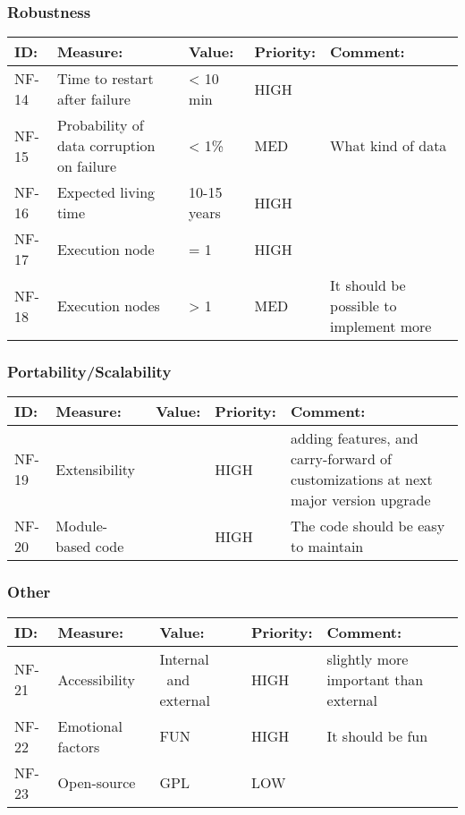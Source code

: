 \subsubsection{Robustness}
\begin{supertabular}{|l|p{5cm}|p{1.8cm}|l|p{4.4cm}|}
\hline
\textbf{ID:} & \textbf{Measure:} & \textbf{Value:} & \textbf{Priority:} & \textbf{Comment:}\\
\hline

NF-14 & Time to restart after failure &
{\textless} 10 min &
HIGH &
\\\hline

NF-15 &
Probability of data corruption on failure &
{\textless} 1\% &
MED & What kind of data\\
\hline

NF-16 & Expected living time & 10-15 years & HIGH & \\
\hline

NF-17 & Execution node & = 1  & HIGH &\\
\hline

NF-18 & Execution nodes & {\textgreater} 1 & MED & It should be possible to
implement more\\
\hline
\end{supertabular}

\subsubsection{Portability/Scalability}

\begin{supertabular}{|l|p{5cm}|p{1.8cm}|l|p{4.4cm}|}
\hline
\textbf{ID:} & \textbf{Measure:} & \textbf{Value:} & \textbf{Priority:} & \textbf{Comment:}\\
\hline

NF-19 & Extensibility && HIGH & adding features, and carry-forward of
customizations at next major version upgrade\\
\hline

NF-20 & Module-based code && HIGH & The code should be easy to maintain\\
\hline
\end{supertabular}

\subsubsection{Other}
\begin{supertabular}{|l|p{5cm}|p{1.8cm}|l|p{4.4cm}|}
\hline
\textbf{ID:} & \textbf{Measure:} & \textbf{Value:} & \textbf{Priority:} & \textbf{Comment:}\\
\hline

NF-21 & Accessibility & Internal \ and external & HIGH & slightly more
important than external \\
\hline

NF-22 & Emotional factors & FUN & HIGH & It should be fun\\
\hline

NF-23 & Open-source & GPL & LOW & \\
\hline
\end{supertabular}

